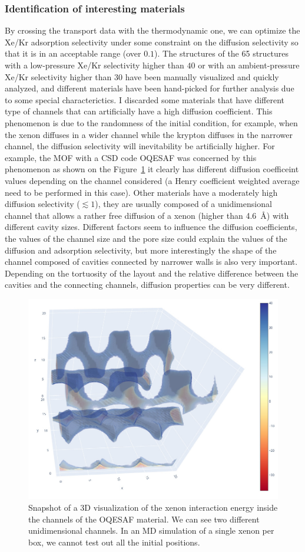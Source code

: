 \documentclass[main]{subfiles}
\begin{document}
\subsubsection{Identification of interesting materials}

By crossing the transport data with the thermodynamic one, we can optimize the Xe/Kr adsorption selectivity under some constraint on the diffusion selectivity so that it is in an acceptable range (over $0.1$). The structures of the 65 structures with a low-pressure Xe/Kr selectivity higher than $40$ or with an ambient-pressure Xe/Kr selectivity higher than $30$ have been manually visualized and quickly analyzed, and different materials have been hand-picked for further analysis due to some special characterictics. I discarded some materials that have different type of channels that can artificially have a high diffusion coefficient. This phenomenon is due to the randomness of the initial condition, for example, when the xenon diffuses in a wider channel while the krypton diffuses in the narrower channel, the diffusion selectivity will inevitability be artificially higher. For example, the MOF with a CSD code OQESAF\autocite{Xie_2011} was concerned by this phenomenon as shown on the Figure~\ref{fgr:OQESAF} it clearly has different diffusion coefficeint values depending on the channel considered (a Henry coefficient weighted average need to be performed in this case). Other materials have a moderately high diffusion selectivity ($\lesssim 1$), they are usually composed of a unidimensional channel that allows a rather free diffusion of a xenon (higher than \SI{4.6}{\angstrom}) with different cavity sizes. Different factors seem to influence the diffusion coefficients, the values of the channel size and the pore size could explain the values of the diffusion and adsorption selectivity, but more interestingly the shape of the channel composed of cavities connected by narrower walls is also very important. Depending on the tortuosity of the layout and the relative difference between the cavities and the connecting channels, diffusion properties can be very different. 

\begin{figure}[ht]
  \centering
    \includegraphics[height=0.4\textwidth]{figures/5-diffusion/viz/OQESAF.jpg}
    \caption{Snapshot of a 3D visualization of the xenon interaction energy inside the channels of the OQESAF\autocite{Xie_2011} material. We can see two different unidimensional channels. In an MD simulation of a single xenon per box, we cannot test out all the initial positions. }\label{fgr:OQESAF}
\end{figure}
\end{document}
